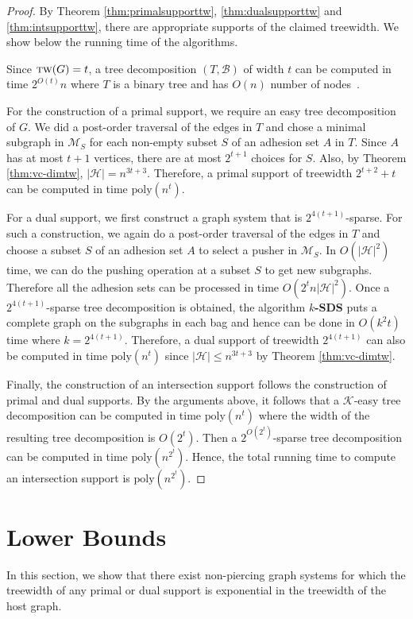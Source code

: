 \documentclass[12pt]{article}
\newcommand{\BB}{\mathcal{B}}
\newcommand{\HH}{\mathcal{H}}
\newcommand{\KK}{\mathcal{K}}
\newcommand{\tw}{\textsc{tw}}
\newcommand{\poly}{\textrm{poly}}
\theoremstyle{case}
\begin{document}
\begin{proof}
By Theorem \ref{thm:primalsupporttw}, \ref{thm:dualsupporttw} and \ref{thm:intsupporttw}, there are appropriate supports of the claimed treewidth. We show below the running time of the algorithms.

Since $\tw(G)=t$, a tree decomposition $(T,\BB)$ of width $t$ can be computed in time $2^{O(t)}n$ where $T$ is a binary tree and has $O(n)$ number of nodes~\cite{bodlaender1998partial,bodlaender2016,BODLAENDER1996358}.

For the construction of a primal support, we require an easy tree decomposition of $G$.
We did a post-order traversal of the edges in $T$ 
and chose a minimal subgraph in $\mathcal{M}_S$ for each non-empty subset $S$ of an adhesion set $A$ in $T$.
Since $A$ has at most $t+1$ vertices, there are at most $2^{t+1}$ choices for $S$.
Also, by Theorem \ref{thm:vc-dimtw}, $|\HH|=n^{3t+3}$.
Therefore, a primal support of treewidth $2^{t+2}+t$ can be computed in time $\poly(n^t)$.

For a dual support, we first construct a graph system that is $2^{4(t+1)}$-sparse.
For such a construction, we again do a post-order traversal of the edges in $T$ and choose a subset $S$ of an adhesion set $A$ to select a pusher in $\mathcal{M}_S$.
In $O(|\HH|^2)$ time, we can do the pushing operation at a subset $S$ to get new subgraphs.
Therefore all the adhesion sets can be processed in time $O(2^tn|\HH|^2)$.
Once a $2^{4(t+1)}$-sparse tree decomposition is obtained, the algorithm {\bf $k$-SDS} puts a complete graph on the subgraphs in each bag and hence can be done in $O(k^2t)$ time where $k=2^{4(t+1)}$.
Therefore, a dual support of treewidth $2^{4(t+1)}$ can also be computed in time $\poly(n^t)$ since $|\HH|\le n^{3t+3}$ by Theorem \ref{thm:vc-dimtw}.

Finally, the construction of an intersection support follows the construction of primal and dual supports.
By the arguments above, it follows that a $\KK$-easy tree decomposition can be computed in time $\poly(n^t)$ where the width of the resulting tree decomposition is $O(2^t)$.
Then a $2^{O(2^t)}$-sparse tree decomposition can be computed in time $\poly(n^{2^t})$.
Hence, the total running time to compute an intersection support is $\poly(n^{2^t})$.
\end{proof}

\section{Lower Bounds}\label{sec:lowerbounds}
In this section, we show that there exist non-piercing graph systems for which the treewidth of any primal or dual support is exponential in the treewidth of the host graph.
\end{document}
